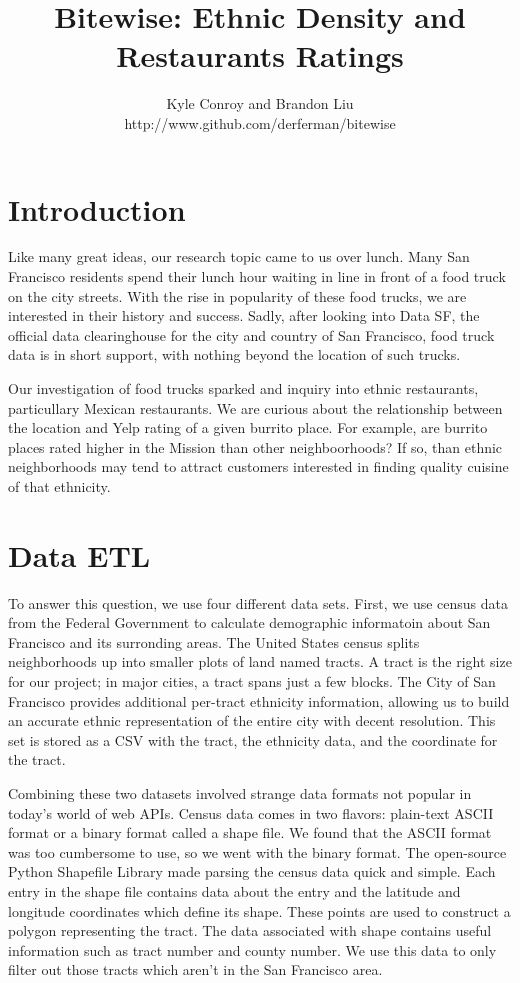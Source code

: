 \documentclass[11pt,twocolumn]{article}
\author{Kyle Conroy and Brandon Liu\\
http://www.github.com/derferman/bitewise}
\title{Bitewise: Ethnic Density and Restaurants Ratings}
\begin{document}
\maketitle

\section{Introduction}

Like many great ideas, our research topic came to us over lunch. Many San Francisco residents spend their lunch hour waiting in line in front of a food truck on the city streets. With the rise in popularity of these food trucks, we are interested in their history and success. Sadly, after looking into Data SF, the official data clearinghouse for the city and country of San Francisco, food truck data is in short support, with nothing beyond the location of such trucks.

Our investigation of food trucks sparked and inquiry into ethnic restaurants, particullary Mexican restaurants. We are curious about the relationship between the location and Yelp rating of a given burrito place. For example, are burrito places rated higher in the Mission than other neighboorhoods? If so, than ethnic neighborhoods may tend to attract customers interested in finding quality cuisine of that ethnicity.

\section{Data ETL}

To answer this question, we use four different data sets. First, we use census data from the Federal Government to calculate demographic informatoin about San Francisco and its surronding areas. The United States census splits neighborhoods up into smaller plots of land named tracts. A tract is the right size for our project; in major cities, a tract spans just a few blocks. The City of San Francisco provides additional per-tract ethnicity information, allowing us to build an accurate ethnic representation of the entire city with decent resolution. This set is stored as a CSV with the tract, the ethnicity data, and the coordinate for the tract.

Combining these two datasets involved strange data formats not popular in today's world of web APIs. Census data comes in two flavors: plain-text ASCII format or a binary format called a shape file. We found that the ASCII format was too cumbersome to use, so we went with the binary format. The open-source Python Shapefile Library made parsing the census data quick and simple. Each entry in the shape file contains data about the entry and the latitude and longitude coordinates which define its shape. These points are used to construct a polygon representing the tract. The data associated with shape contains useful information such as tract number and county number. We use this data to only filter out those tracts which aren't in the San Francisco area.
\end{document}
